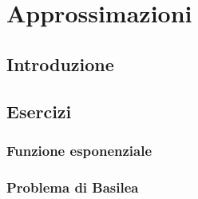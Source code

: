 \setchapterpreamble[u]{\margintoc}
\chapter{Approssimazioni}

\section{Introduzione}

\section{Esercizi}

\subsection{Funzione esponenziale}


\subsection{Problema di Basilea}


